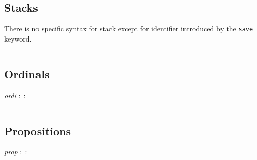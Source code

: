 \subsection{Stacks}

There is no specific syntax for stack except for identifier introduced by the
{\tt save} keyword.

\def\w{9.2cm}
\begin{longtable}{rll}
\end{longtable}

\subsection{Ordinals}

\noindent \emph{ordi} $::=$

\def\w{9.2cm}
\begin{longtable}{rll}
\end{longtable}

\subsection{Propositions}

\noindent \emph{prop} $::=$


